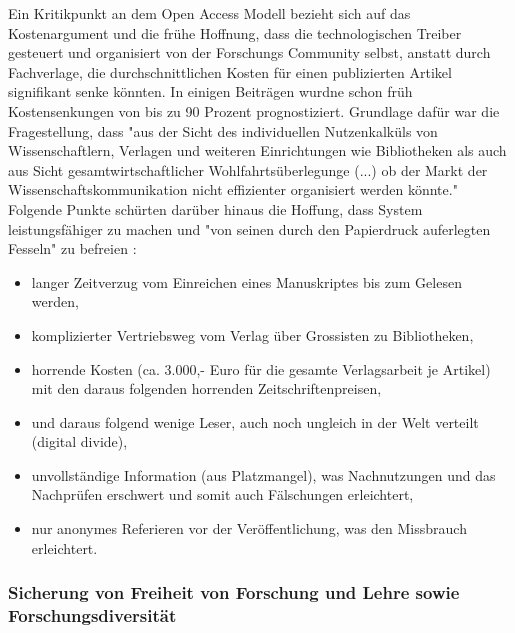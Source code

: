 Ein Kritikpunkt an dem Open Access Modell bezieht sich auf das Kostenargument und die frühe Hoffnung, dass die technologischen Treiber gesteuert und organisiert von der Forschungs Community selbst, anstatt durch Fachverlage, die durchschnittlichen Kosten für einen publizierten Artikel signifikant senke könnten. In einigen Beiträgen wurdne schon früh Kostensenkungen von bis zu 90 Prozent\cite{hilf_2004} prognostiziert. Grundlage dafür war die Fragestellung, dass "aus der Sicht des individuellen Nutzenkalküls von Wissenschaftlern, Verlagen und weiteren Einrichtungen wie Bibliotheken als auch aus Sicht gesamtwirtschaftlicher Wohlfahrtsüberlegunge (...) ob der Markt der Wissenschaftskommunikation nicht effizienter organisiert werden könnte."\cite{Hess_2006} Folgende Punkte schürten darüber hinaus die Hoffung, dass System leistungsfähiger zu machen und "von seinen durch den Papierdruck auferlegten Fesseln" zu befreien \cite{hilf_2004}:
\begin{itemize}
\item langer Zeitverzug vom Einreichen eines Manuskriptes bis zum Gelesen werden,
\item komplizierter Vertriebsweg vom Verlag über Grossisten zu Bibliotheken,
\item horrende Kosten (ca. 3.000,- Euro für die gesamte Verlagsarbeit je Artikel) mit den daraus folgenden horrenden Zeitschriftenpreisen,
\item und daraus folgend wenige Leser, auch noch ungleich in der Welt verteilt (digital divide),
\item unvollständige Information (aus Platzmangel), was Nachnutzungen und das Nachprüfen erschwert und somit auch Fälschungen erleichtert,
\item nur anonymes Referieren vor der Veröffentlichung, was den Missbrauch erleichtert. 
\end{itemize}

\subsubsection{Sicherung von Freiheit von Forschung und Lehre sowie Forschungsdiversität}

